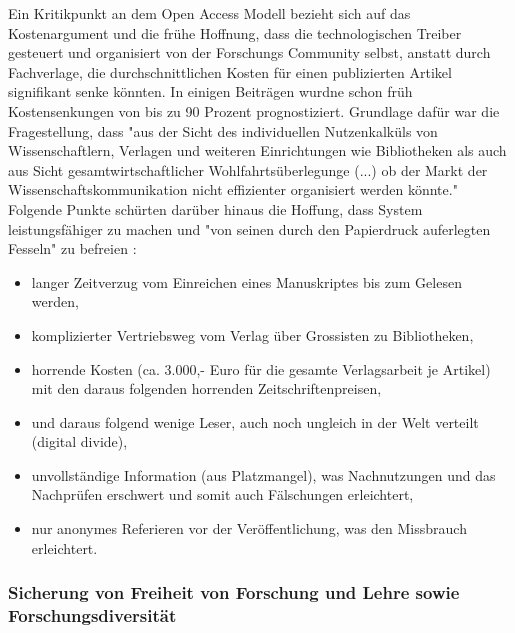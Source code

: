 Ein Kritikpunkt an dem Open Access Modell bezieht sich auf das Kostenargument und die frühe Hoffnung, dass die technologischen Treiber gesteuert und organisiert von der Forschungs Community selbst, anstatt durch Fachverlage, die durchschnittlichen Kosten für einen publizierten Artikel signifikant senke könnten. In einigen Beiträgen wurdne schon früh Kostensenkungen von bis zu 90 Prozent\cite{hilf_2004} prognostiziert. Grundlage dafür war die Fragestellung, dass "aus der Sicht des individuellen Nutzenkalküls von Wissenschaftlern, Verlagen und weiteren Einrichtungen wie Bibliotheken als auch aus Sicht gesamtwirtschaftlicher Wohlfahrtsüberlegunge (...) ob der Markt der Wissenschaftskommunikation nicht effizienter organisiert werden könnte."\cite{Hess_2006} Folgende Punkte schürten darüber hinaus die Hoffung, dass System leistungsfähiger zu machen und "von seinen durch den Papierdruck auferlegten Fesseln" zu befreien \cite{hilf_2004}:
\begin{itemize}
\item langer Zeitverzug vom Einreichen eines Manuskriptes bis zum Gelesen werden,
\item komplizierter Vertriebsweg vom Verlag über Grossisten zu Bibliotheken,
\item horrende Kosten (ca. 3.000,- Euro für die gesamte Verlagsarbeit je Artikel) mit den daraus folgenden horrenden Zeitschriftenpreisen,
\item und daraus folgend wenige Leser, auch noch ungleich in der Welt verteilt (digital divide),
\item unvollständige Information (aus Platzmangel), was Nachnutzungen und das Nachprüfen erschwert und somit auch Fälschungen erleichtert,
\item nur anonymes Referieren vor der Veröffentlichung, was den Missbrauch erleichtert. 
\end{itemize}

\subsubsection{Sicherung von Freiheit von Forschung und Lehre sowie Forschungsdiversität}

